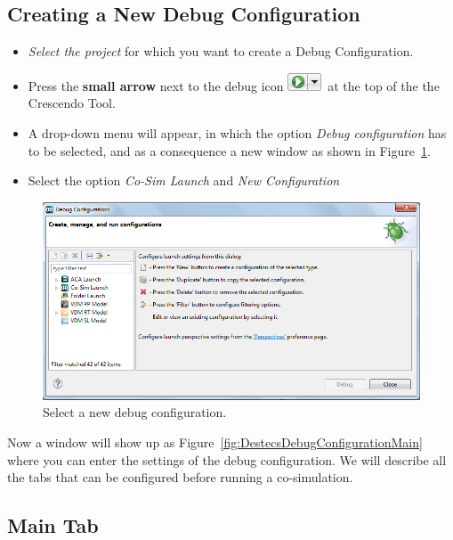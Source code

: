 \documentclass{crescendorepchap}
\begin{document}
\subsection{Creating a New Debug Configuration}

\begin{itemize}
\item
  \emph{Select the project} for which you want to create a Debug
  Configuration.
\item
  Press the \textbf{small arrow} next to the debug icon
  \includegraphics{images/DestecsDebugButtonArrow.png}~at the top of the
  the Crescendo Tool.
\item
  A drop-down menu will appear, in which the option
  \emph{Debug configuration} has to be selected, and as a consequence
a new window as shown in Figure~\ref{fig:DestecsDebugConfigurationNew}.
\item
  Select the option \emph{Co-Sim Launch} and
  \emph{New Configuration}
\end{itemize}

\begin{figure}[htbp]
\centering
\includegraphics[width=.6\textwidth]{images/DestecsDebugConfigurationNew.png}
\caption{Select a new debug configuration.\label{fig:DestecsDebugConfigurationNew}}
\end{figure}

Now a window will show up as Figure~\ref{fig:DestecsDebugConfigurationMain}
where you can enter the settings of the debug
configuration. We will describe all the tabs that can be configured before running a
co-simulation.

\subsection{Main Tab}
\end{document}

